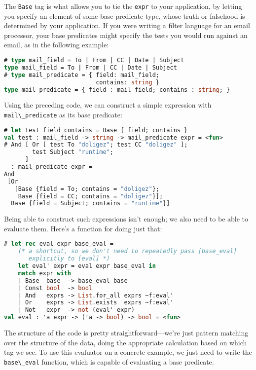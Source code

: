The \passthrough{\lstinline!Base!} tag is what allows you to tie the
\passthrough{\lstinline!expr!} to your application, by letting you
specify an element of some base predicate type, whose truth or falsehood
is determined by your application. If you were writing a filter language
for an email processor, your base predicates might specify the tests you
would run against an email, as in the following example:

\begin{lstlisting}[language=Caml]
# type mail_field = To | From | CC | Date | Subject
type mail_field = To | From | CC | Date | Subject
# type mail_predicate = { field: mail_field;
                          contains: string }
type mail_predicate = { field : mail_field; contains : string; }
\end{lstlisting}

Using the preceding code, we can construct a simple expression with
\passthrough{\lstinline!mail\_predicate!} as its base predicate:

\begin{lstlisting}[language=Caml]
# let test field contains = Base { field; contains }
val test : mail_field -> string -> mail_predicate expr = <fun>
# And [ Or [ test To "doligez"; test CC "doligez" ];
        test Subject "runtime";
      ]
- : mail_predicate expr =
And
 [Or
   [Base {field = To; contains = "doligez"};
    Base {field = CC; contains = "doligez"}];
  Base {field = Subject; contains = "runtime"}]
\end{lstlisting}

Being able to construct such expressions isn't enough; we also need to
be able to evaluate them. Here's a function for doing just that:

\begin{lstlisting}[language=Caml]
# let rec eval expr base_eval =
    (* a shortcut, so we don't need to repeatedly pass [base_eval]
       explicitly to [eval] *)
    let eval' expr = eval expr base_eval in
    match expr with
    | Base  base  -> base_eval base
    | Const bool  -> bool
    | And   exprs -> List.for_all exprs ~f:eval'
    | Or    exprs -> List.exists  exprs ~f:eval'
    | Not   expr  -> not (eval' expr)
val eval : 'a expr -> ('a -> bool) -> bool = <fun>
\end{lstlisting}

The structure of the code is pretty straightforward---we're just pattern
matching over the structure of the data, doing the appropriate
calculation based on which tag we see. To use this evaluator on a
concrete example, we just need to write the
\passthrough{\lstinline!base\_eval!} function, which is capable of
evaluating a base predicate.

